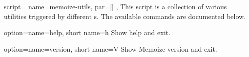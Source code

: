 \documentclass[a4paper,11pt]{article}
\begin{document}
\begin{doc}{
    script={
      name=memoize-utils,
      par=[]  
    },
  }
  This script is a collection of various utilities triggered by different
  s.  The available commands are documented below.
  
  \begin{doc}{
      option={name=help, short name=h}
    }
    Show help and exit.
  \end{doc}
  \begin{doc}{
      option={name=version, short name=V}
    }
    Show Memoize version and exit.
  \end{doc}
\end{doc}
\end{document}
